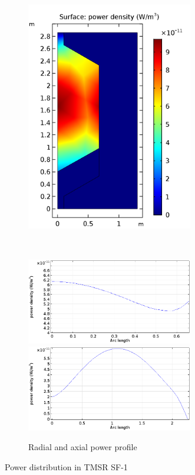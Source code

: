 \documentclass{elsarticle}
\begin{document}
\begin{figure}
        \begin{subfigure}{0.45\textwidth}
        \centering
        \includegraphics[width=0.8\textwidth]{./images/diffusion/tmsr/SS/non_ms/Pdensity(steady_state).png}
        \end{subfigure}
        ~
        \begin{subfigure}{0.5\textwidth}
        \centering
        \includegraphics[width=0.8\textwidth]{./images/diffusion/tmsr/SS/non_ms/power_peaking_r.png}
        \includegraphics[width=0.8\textwidth]{./images/diffusion/tmsr/SS/non_ms/power_peaking_z.png}
        \caption*{Radial and axial power profile}
    \end{subfigure}%
    
    \caption{Power distribution in TMSR SF-1}
    \label{fig:tmsr_power_ss}
\end{figure}
\end{document}
